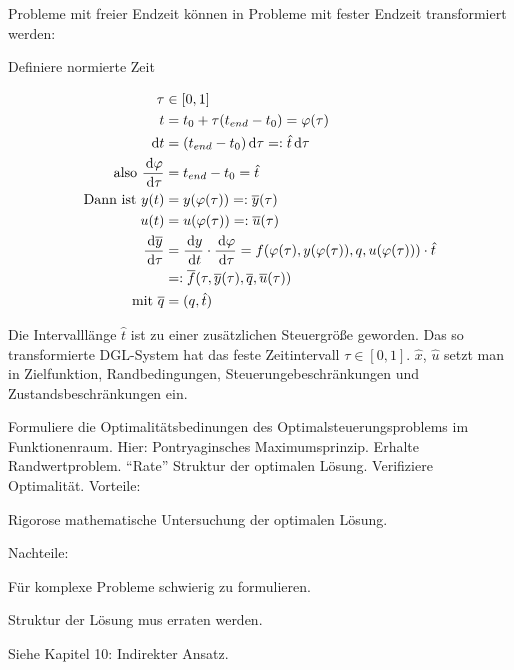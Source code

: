 
Probleme mit freier Endzeit können in Probleme mit fester Endzeit transformiert werden:

Definiere normierte Zeit 

\begin{align*}
\tau &\in [0,1] \\
t &= t_0 + \tau ({t_{end}}-t_0) = \varphi(\tau) \\
\,\mathrm d t &= ({t_{end}} -t_0) \,\mathrm d \tau =: \hat t \,\mathrm d \tau \\
\text{also } \frac{\,\mathrm d \varphi}{\,\mathrm d \tau} &= {t_{end}} - t_0 = \hat t \\
\text{Dann ist } y(t) &= y(\varphi(\tau)) =: \overline y(\tau)  \\
u(t) &= u(\varphi(\tau)) =: \overline u(\tau) \\
\frac{\,\mathrm d \overline y}{\,\mathrm d \tau} &= \frac{\,\mathrm d y}{\,\mathrm d t} \cdot \frac{\,\mathrm d \varphi}{\,\mathrm d \tau} = f(\varphi(\tau), y(\varphi(\tau)), q, u(\varphi(\tau))) \cdot \hat t \\
&=: \overline f(\tau, \overline y(\tau), \overline q, \overline u(\tau)) \\
\text{mit } \overline q &= (q, \hat t) \\
\end{align*}

Die Intervalllänge $\hat t$ ist zu einer zusätzlichen Steuergröße geworden. Das so transformierte DGL-System hat das feste Zeitintervall $\tau \in [0,1]$. $\hat x$, $\hat u$ setzt man in Zielfunktion, Randbedingungen, Steuerungebeschränkungen und Zustandsbeschränkungen ein.



Formuliere die Optimalitätsbedinungen des Optimalsteuerungsproblems im Funktionenraum. Hier: Pontryaginsches Maximumsprinzip. Erhalte Randwertproblem. "`Rate"' Struktur der optimalen Lösung. Verifiziere Optimalität. Vorteile:

\bitm
\item Rigorose mathematische Untersuchung der optimalen Lösung.
\eitm

Nachteile:

\bitm
\item Für komplexe Probleme schwierig zu formulieren.
\item Struktur der Lösung mus erraten werden.
\eitm

Siehe Kapitel 10: Indirekter Ansatz.



